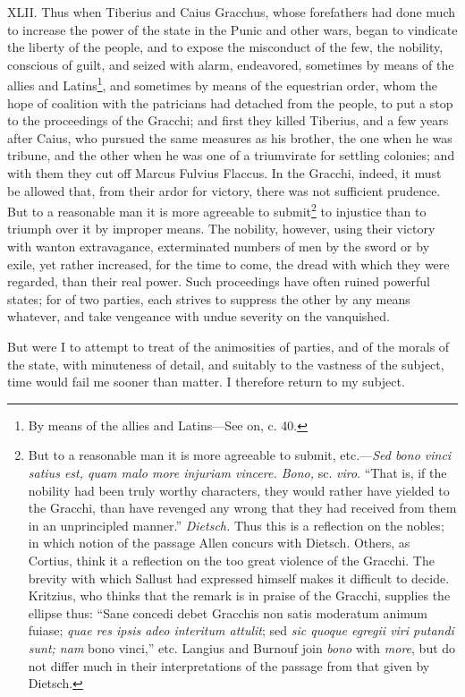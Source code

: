 XLII. Thus when Tiberius and Caius Gracchus, whose forefathers had
done much to increase the power of the state in the Punic and other
wars, began to vindicate the liberty of the people, and to expose the
misconduct of the few, the nobility, conscious of guilt, and seized
with alarm, endeavored, sometimes by means of the allies and
Latins\footnote{By means of the allies and Latins—See on, c. 40.}, and sometimes by means of the equestrian order, whom the
hope of coalition with the patricians had detached from the people, to
put a stop to the proceedings of the Gracchi; and first they killed
Tiberius, and a few years after Caius, who pursued the same measures
as his brother, the one when he was tribune, and the other when he was
one of a triumvirate for settling colonies; and with them they cut off
Marcus Fulvius Flaccus. In the Gracchi, indeed, it must be allowed
that, from their ardor for victory, there was not sufficient prudence.
But to a reasonable man it is more agreeable to submit\footnote{But to a reasonable man it is more agreeable to submit,
etc.—\emph{Sed bono vinci satius est, quam malo more injuriam vincere.
Bono,} sc. \emph{viro}. ``That is, if the nobility had been truly worthy
characters, they would rather have yielded to the Gracchi, than have
revenged any wrong that they had received from them in an unprincipled
manner.'' \emph{Dietsch.} Thus this is a reflection on the nobles; in which
notion of the passage Allen concurs with Dietsch. Others, as Cortius,
think it a reflection on the too great violence of the Gracchi. The
brevity with which Sallust had expressed himself makes it difficult to
decide. Kritzius, who thinks that the remark is in praise of the
Gracchi, supplies the ellipse thus: ``Sane concedi debet Gracchis non
satis moderatum animum fuiase; \emph{quae res ipsis adeo interitum
attulit}; sed \emph{sic quoque egregii viri putandi sunt; nam} bono vinci,''
etc. Langius and Burnouf join \emph{bono} with \emph{more}, but do not differ
much in their interpretations of the passage from that given by
Dietsch.} to
injustice than to triumph over it by improper means. The nobility,
however, using their victory with wanton extravagance, exterminated
numbers of men by the sword or by exile, yet rather increased, for the
time to come, the dread with which they were regarded, than their real
power. Such proceedings have often ruined powerful states; for of two
parties, each strives to suppress the other by any means whatever, and
take vengeance with undue severity on the vanquished.

But were I to attempt to treat of the animosities of parties, and of
the morals of the state, with minuteness of detail, and suitably to
the vastness of the subject, time would fail me sooner than matter. I
therefore return to my subject.

